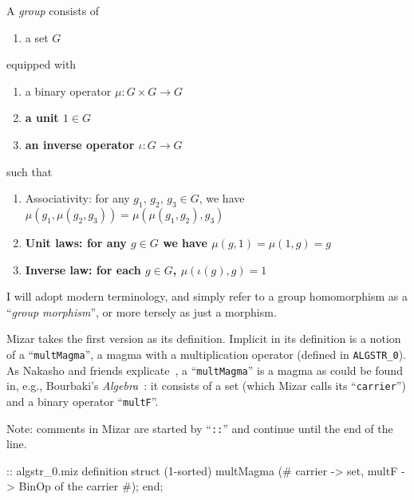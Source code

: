 \begin{definition}[Version 2]
  A \emph{group} consists of
  \begin{enumerate}
  \item a set $G$
  \end{enumerate}
  equipped with
  \begin{enumerate}
  \item a binary operator $\mu\colon G\times G\to G$
  \item \textbf{a unit $1\in G$}
  \item \textbf{an inverse operator $\iota\colon G\to G$}
  \end{enumerate}
  such that
  \begin{enumerate}
  \item Associativity: for any $g_{1}$, $g_{2}$, $g_{3}\in G$, we have
    $\mu(g_{1}, \mu(g_{2},g_{3})) = \mu(\mu(g_{1},g_{2}),g_{3})$
  \item \textbf{Unit laws: for any $g\in G$ we have $\mu(g,1)=\mu(1,g)=g$}
  \item \textbf{Inverse law: for each $g\in G$, $\mu(\iota(g),g)=1$}
  \end{enumerate}
\end{definition}

\begin{remark}
I will adopt modern terminology, and simply refer to a group
homomorphism as a ``\emph{group morphism}'', or more tersely as just a
morphism.
\end{remark}

 Mizar takes the first version as its definition. Implicit in its
definition is a notion of a ``\verb#multMagma#'', a magma with a
multiplication operator (defined in \verb#ALGSTR_0#). As Nakasho and
friends explicate~\cite{nakasho2014formalization}, a ``\verb#multMagma#''
is a magma as could be found in, e.g., Bourbaki's
\emph{Algebra}~\cite[see Ch.I\S1.1]{bourbaki1974elements}: it
consists of a set (which Mizar calls its ``\verb#carrier#'') and a
binary operator ``\verb#multF#''.

Note: comments in Mizar are started by ``\verb#::#'' and continue until
the end of the line.

\begin{mizar}
:: algstr_0.miz
definition
  struct (1-sorted) multMagma (# carrier -> set,
  multF -> BinOp of the carrier
  #);
end;
\end{mizar}

